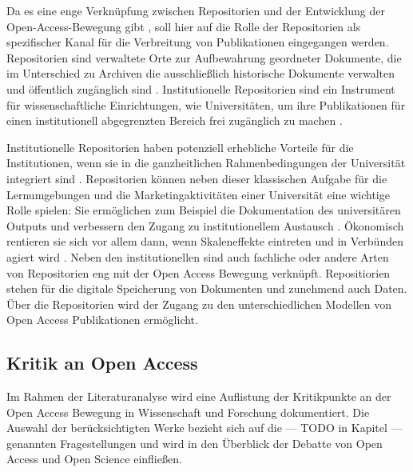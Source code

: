 Da es eine enge Verknüpfung zwischen Repositorien und der Entwicklung der Open-Access-Bewegung gibt \cite{offhaus_2012_institutionelle_repos}, soll hier auf die Rolle der Repositorien als spezifischer Kanal für die Verbreitung von Publikationen eingegangen werden. Repositorien sind verwaltete Orte zur Aufbewahrung geordneter Dokumente, die im Unterschied zu Archiven die ausschließlich historische Dokumente verwalten und öffentlich zugänglich sind \cite{suchen}. Institutionelle Repositorien sind ein Instrument für wissenschaftliche Einrichtungen, wie Universitäten, um ihre Publikationen für einen institutionell abgegrenzten Bereich frei zugänglich zu machen \cite{dobratz_2007_open}.

Institutionelle Repositorien haben potenziell erhebliche Vorteile für die Institutionen, wenn sie in die ganzheitlichen Rahmenbedingungen der Universität integriert sind \cite{steele_2006}. Repositorien können neben dieser klassischen Aufgabe für die Lernumgebungen und die Marketingaktivitäten einer Universität eine wichtige Rolle spielen: Sie ermöglichen zum Beispiel die Dokumentation des universitären Outputs und verbessern den Zugang zu institutionellem Austausch \cite{steele_2006}. Ökonomisch rentieren sie sich vor allem dann, wenn Skaleneffekte eintreten und in Verbünden agiert wird \cite{blythe_2005value}. Neben den institutionellen sind auch fachliche oder andere Arten von Repositorien eng mit der Open Access Bewegung verknüpft. Repositiorien stehen  für die digitale Speicherung von Dokumenten und zunehmend auch Daten. Über die Repositorien wird der Zugang zu den unterschiedlichen Modellen von Open Access Publikationen ermöglicht.

\subsection{Kritik an Open Access}

Im Rahmen der Literaturanalyse wird eine Auflistung der Kritikpunkte an der Open Access Bewegung in Wissenschaft und Forschung dokumentiert. Die Auswahl der berücksichtigten Werke bezieht sich auf die --- TODO in Kapitel --- genannten Fragestellungen und wird in den Überblick der Debatte von Open Access und Open Science einfließen.

